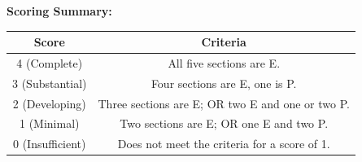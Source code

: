 \documentclass[12pt]{article}
\begin{document}
\vspace{0.8cm}

\noindent\textbf{Scoring Summary:}

\begin{center}
\renewcommand{\arraystretch}{1.4}
\begin{tabular}{|c|c|}
\hline
\textbf{Score} & \textbf{Criteria} \\
\hline
4 (Complete) & All five sections are E. \\
\hline
3 (Substantial) & Four sections are E, one is P. \\
\hline
2 (Developing) & Three sections are E; OR two E and one or two P. \\
\hline
1 (Minimal) & Two sections are E; OR one E and two P. \\
\hline
0 (Insufficient) & Does not meet the criteria for a score of 1. \\
\hline
\end{tabular}
\end{center}
\end{document}
